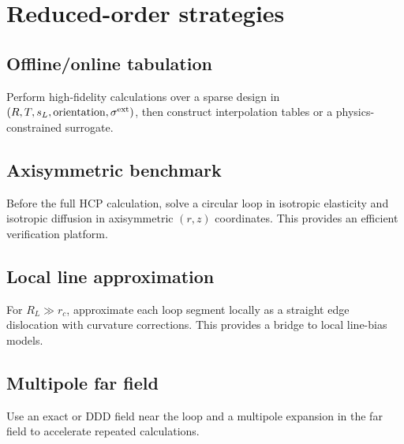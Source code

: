 \documentclass[11pt]{article}
\begin{document}
\section{Reduced-order strategies}
\subsection{Offline/online tabulation}
Perform high-fidelity calculations over a sparse design in $(R,T,s_L,\text{orientation},\sigma^{\rm ext})$, then construct interpolation tables or a physics-constrained surrogate.

\subsection{Axisymmetric benchmark}
Before the full HCP calculation, solve a circular loop in isotropic elasticity and isotropic diffusion in axisymmetric $(r,z)$ coordinates. This provides an efficient verification platform.

\subsection{Local line approximation}
For $R_L\gg r_c$, approximate each loop segment locally as a straight edge dislocation with curvature corrections. This provides a bridge to local line-bias models.

\subsection{Multipole far field}
Use an exact or DDD field near the loop and a multipole expansion in the far field to accelerate repeated calculations.
\end{document}
